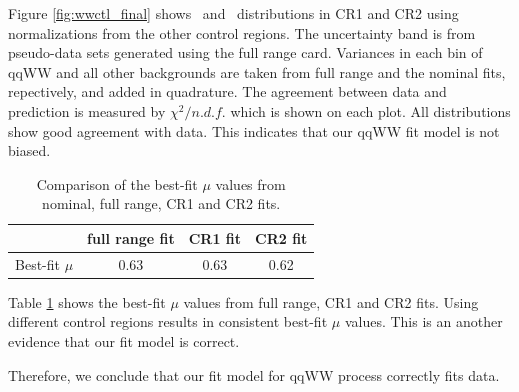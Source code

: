Figure \ref{fig:wwctl_final} shows \mt~and \mll~distributions in CR1 and CR2 using 
normalizations from the other control regions. The uncertainty band is from pseudo-data 
sets generated using the full range card. Variances in each bin of qqWW and all other 
backgrounds are taken from full range and the nominal fits, repectively, and added in quadrature. 
The agreement between data and prediction is measured by $\chi^2/n.d.f.$ which is 
shown on each plot. All distributions show good agreement with data.
This indicates that our qqWW fit model is not biased.
%
\begin{table}
\begin{center}
\begin{tabular}{c|ccc}
\hline
                    & full range fit    & CR1 fit   & CR2 fit   \\
\hline
Best-fit $\mu$      & 0.63              & 0.63      & 0.62      \\
\hline
\end{tabular}
\end{center}
\caption{Comparison of the best-fit $\mu$ values from nominal, full range, CR1 and CR2 fits.} 
\label{tab:bestfitmu_compare}
\end{table}
Table \ref{tab:bestfitmu_compare} shows the best-fit $\mu$ values from full range, 
CR1 and CR2 fits. Using different control regions results in consistent best-fit $\mu$ values. 
This is an another evidence that our fit model is correct. 

Therefore, we conclude that our fit model for qqWW process correctly fits data.  
